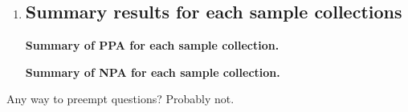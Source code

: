 \begin{enumerate}
    	\item \subsection{Summary results for each sample collections}
	
    	\captionsetup{width=.8\textwidth}
        \begin{table}[H]
        \centering
        
        \caption[Summary of PPA for each sample collection]
        {\textbf{Summary of PPA for each sample collection.}}
        \label{t:ppa_summary_collections}
        \end{table}
    	
        \captionsetup{width=.8\textwidth}
        \begin{table}[H]
        \centering
        
        \caption[Summary of NPA for each sample collection]
        {\textbf{Summary of NPA for each sample collection.}}
        \label{t:npa_summary_collections}
        \end{table}
\end{enumerate}

Any way to preempt questions? Probably not.